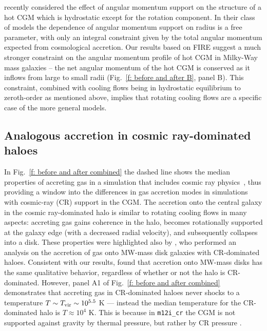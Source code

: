 \documentclass[fleqn,usenatbib]{mnras}
\begin{document}

\cite{Sormani2018} recently considered the effect of angular momentum support on the structure of a hot CGM which is hydrostatic except for the rotation component.
In their class of models the dependence of angular momentum support on radius is a free parameter, with only an integral constraint given by the total angular momentum expected from  cosmological accretion.
Our results based on FIRE suggest a much stronger constraint on the angular momentum profile of hot CGM in Milky-Way mass galaxies -- the net angular momentum of the hot CGM is conserved as it inflows from large to small radii (Fig.~\ref{f: before and after B}, panel B). 
This constraint, combined with cooling flows being in hydrostatic equilibrium to zeroth-order as mentioned above, implies that rotating cooling flows are a specific case of the more general \cite{Sormani2018} models. 



\subsection{Analogous accretion in cosmic ray-dominated haloes}
\label{s: crs}

In Fig.~\ref{f: before and after combined} the dashed line shows the median properties of accreting gas in a simulation that includes cosmic ray physics~\citep[][]{Chan2019, Hopkins2020a}, thus providing a window into the differences in gas accretion modes in simulations with cosmic-ray (CR) support in the CGM.
The accretion onto the central galaxy in the cosmic ray-dominated halo is similar to rotating cooling flows in many aspects:
accreting gas gains coherence in the halo, becomes rotationally supported at the galaxy edge (with a decreased radial velocity), and subsequently collapses into a disk.
These properties were highlighted also by \cite{Trapp2021}, who performed an analysis on the accretion of gas onto MW-mass disk galaxies with CR-dominated haloes.
Consistent with our results, \citeauthor{Trapp2021} found that accretion onto MW-mass disks has the same qualitative behavior, regardless of whether or not the halo is CR-dominated.
However, panel A1 of Fig.~\ref{f: before and after combined} demonstrates that accreting gas in CR-dominated haloes never shocks to a temperature $T \sim T_{\rm vir} \sim 10^{5.5}$ K --- instead the median temperature for the CR-dominated halo is $T\approx10^4$ K.
This is because in \texttt{m12i\_cr} the CGM is not supported against gravity by thermal pressure, but rather by CR pressure \citep{Ji2020}.
\end{document}
